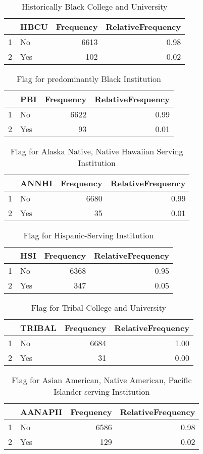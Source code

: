 \documentclass{article}\usepackage[]{graphicx}\usepackage[]{color}
\begin{document}
\begin{table}[ht]
\centering
\begin{tabular}{rlrr}
  \hline
 & HBCU & Frequency & RelativeFrequency \\ 
  \hline
1 & No & 6613 & 0.98 \\ 
  2 & Yes & 102 & 0.02 \\ 
   \hline
\end{tabular}
\caption{Historically Black College and University} 
\end{table}
\begin{table}[ht]
\centering
\begin{tabular}{rlrr}
  \hline
 & PBI & Frequency & RelativeFrequency \\ 
  \hline
1 & No & 6622 & 0.99 \\ 
  2 & Yes &  93 & 0.01 \\ 
   \hline
\end{tabular}
\caption{Flag for predominantly Black Institution} 
\end{table}
\begin{table}[ht]
\centering
\begin{tabular}{rlrr}
  \hline
 & ANNHI & Frequency & RelativeFrequency \\ 
  \hline
1 & No & 6680 & 0.99 \\ 
  2 & Yes &  35 & 0.01 \\ 
   \hline
\end{tabular}
\caption{Flag for Alaska Native, Native Hawaiian Serving Institution} 
\end{table}
\begin{table}[ht]
\centering
\begin{tabular}{rlrr}
  \hline
 & HSI & Frequency & RelativeFrequency \\ 
  \hline
1 & No & 6368 & 0.95 \\ 
  2 & Yes & 347 & 0.05 \\ 
   \hline
\end{tabular}
\caption{Flag for Hispanic-Serving Institution} 
\end{table}
\begin{table}[ht]
\centering
\begin{tabular}{rlrr}
  \hline
 & TRIBAL & Frequency & RelativeFrequency \\ 
  \hline
1 & No & 6684 & 1.00 \\ 
  2 & Yes &  31 & 0.00 \\ 
   \hline
\end{tabular}
\caption{Flag for Tribal College and University} 
\end{table}
\begin{table}[ht]
\centering
\begin{tabular}{rlrr}
  \hline
 & AANAPII & Frequency & RelativeFrequency \\ 
  \hline
1 & No & 6586 & 0.98 \\ 
  2 & Yes & 129 & 0.02 \\ 
   \hline
\end{tabular}
\caption{Flag for Asian American, Native American, Pacific Islander-serving Institution} 
\end{table}
\end{document}
